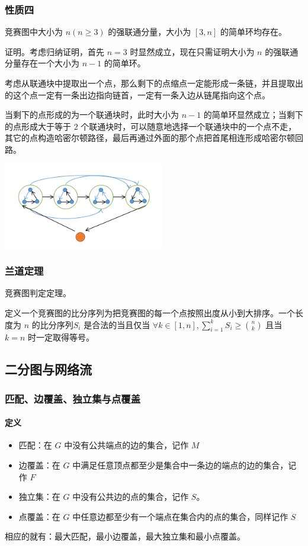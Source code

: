 \documentclass[UTF-8]{ctexart}
\begin{document}
				\subsubsection{性质四}
				竞赛图中大小为 $n(n\ge3)$ 的强联通分量，大小为 $[3,n]$ 的简单环均存在。
				
				证明。考虑归纳证明，首先 $n=3$ 时显然成立，现在只需证明大小为 $n$ 的强联通分量存在一个大小为 $n-1$ 的简单环。
				
				考虑从联通块中提取出一个点，那么剩下的点缩点一定能形成一条链，并且提取出的这个点一定有一条出边指向链首，一定有一条入边从链尾指向这个点。
				
				当剩下的点形成的为一个联通块时，此时大小为 $n-1$ 的简单环显然成立；当剩下的点形成大于等于 $2$ 个联通块时，可以随意地选择一个联通块中的一个点不走，其它的点构造哈密尔顿路径，最后再通过外面的那个点把首尾相连形成哈密尔顿回路。
				\begin{center}
					\includegraphics[width=7cm]{file//hamiltonian3.png}
				\end{center}
				\subsubsection{兰道定理}
				竞赛图判定定理。
				
				定义一个竞赛图的比分序列为把竞赛图的每一个点按照出度从小到大排序。一个长度为 $n$ 的比分序列$S_i$ 是合法的当且仅当 $\forall k\in[1,n],\sum_{i=1}^kS_i\ge\binom{n}{k}$ 且当 $k=n$ 时一定取得等号。
		\subsection{二分图与网络流}
			\subsubsection{匹配、边覆盖、独立集与点覆盖}
			\paragraph{定义}
			\begin{itemize}
				\item 匹配：在 $G$ 中没有公共端点的边的集合，记作 $M$
				\item 边覆盖：在 $G$ 中满足任意顶点都至少是集合中一条边的端点的边的集合，记作 $F$
				\item 独立集：在 $G$ 中没有公共边的点的集合，记作 $S$。
				\item 点覆盖：在 $G$ 中任意边都至少有一个端点在集合内的点的集合，同样记作 $S$
			\end{itemize}
			相应的就有：最大匹配，最小边覆盖，最大独立集和最小点覆盖。
\end{document}
